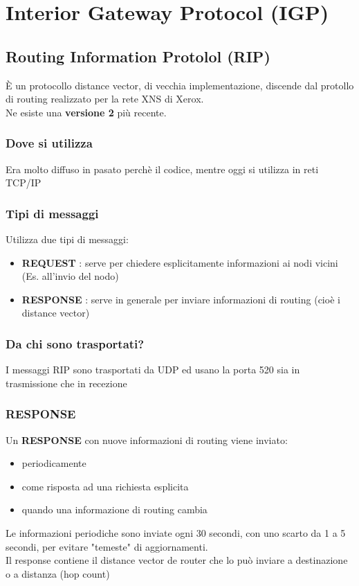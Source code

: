 \documentclass{report}
\begin{document}
    \chapter{Interior Gateway Protocol (IGP)}
        \section{Routing Information Protolol (RIP)}
            È un protocollo distance vector, di vecchia implementazione, discende dal protollo di routing
            realizzato per la rete XNS di Xerox.
            \\
            Ne esiste una \textbf{versione 2} più recente.
            \subsection{Dove si utilizza}   
                Era molto diffuso in pasato perchè il codice, mentre oggi si utilizza in reti TCP/IP 
            \subsection{Tipi di messaggi}
                Utilizza due tipi di messaggi:
                \begin{itemize}
                    \item \textbf{REQUEST} : serve per chiedere esplicitamente informazioni ai nodi vicini (Es. all'invio del nodo)
                    \item \textbf{RESPONSE} : serve in generale per inviare informazioni di routing (cioè i distance vector)
                \end{itemize}
            \subsection{Da chi sono trasportati?}
                I messaggi RIP sono trasportati da UDP ed usano la porta 520 sia in trasmissione che in recezione
            \subsection{RESPONSE}
                Un \textbf{RESPONSE} con nuove informazioni di routing viene inviato:
                \begin{itemize}
                    \item periodicamente
                    \item come risposta ad una richiesta esplicita
                    \item quando una informazione di routing cambia
                \end{itemize}
                Le informazioni periodiche sono inviate ogni 30 secondi, con uno scarto da 1 a 5 secondi, per evitare "temeste" di aggiornamenti.
                \\
                Il response contiene il distance vector de router che lo può inviare a destinazione o a distanza (hop count)
\end{document}
